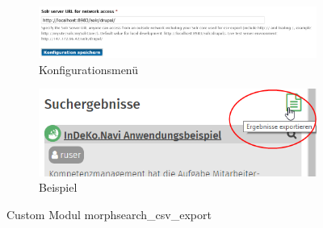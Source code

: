 \begin{figure}[H]
	\centering
	\begin{subfigure}[b]{0.65\textwidth}
		\centering
		\includegraphics[width=\linewidth]{images/config_searchcsv}
		\caption{Konfigurationsmenü}
		\label{fig:config_searchcsv}
	\end{subfigure}
	\begin{subfigure}[b]{0.30\textwidth}
		\centering
		\includegraphics[width=\linewidth]{images/example_searchcsv}
		\caption[]{Beispiel}
		\label{fig:example_searchcsv}
	\end{subfigure}
	\caption{Custom Modul morphsearch\_csv\_export}
	\label{fig:searchcsvexport}
\end{figure}


